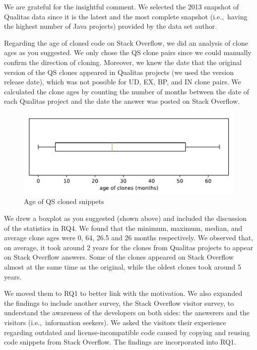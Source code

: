 \documentclass[a4paper,twoside,10pt]{reviewresponse}
\begin{document}
We are grateful for the insightful comment. We selected the 2013 snapshot of
Qualitas data since it is the latest and the most complete snapshot (i.e.,~having
the highest number of Java projects) provided by the data set author.

Regarding the age of cloned code on Stack Overflow, we did an analysis of clone
ages as you suggested. We only chose the QS clone pairs since we could manually
confirm the direction of cloning. Moreover, we knew the date that the original
version of the QS clones appeared in Qualitas projects (we used the version
release date), which was not possible for UD, EX, BP, and IN clone pairs. We
calculated the clone ages by counting the number of months between the date of
each Qualitas project and the date the answer was posted on Stack Overflow.

\begin{figure}[H] \centering
	\includegraphics[width=0.7\linewidth]{../boxplot_clone_age} \caption{Age of QS
		cloned snippets} \label{fig:boxplotcloneage} \end{figure}

We drew a boxplot as you suggested (shown above) and included the discussion of
the statistics in RQ4. We found that the minimum, maximum, median, and average
clone ages were 0, 64, 26.5 and 26 months respectively. We observed that, on
average, it took around 2 years for the clones from Qualitas projects to appear
on Stack Overflow answers. Some of the clones appeared on Stack Overflow almost
at the same time as the original, while the oldest clones took around 5 years.


We moved them to RQ1 to better link with the motivation. We also expanded the
findings to include another survey, the Stack Overflow visitor survey,
to understand the awareness of the developers on both sides: the answerers and
the visitors (i.e.,~information seekers). We asked the visitors their experience
regarding outdated and license-incompatible code caused by copying and reusing
code snippets from Stack Overflow. The findings are incorporated into RQ1.
\end{document}
